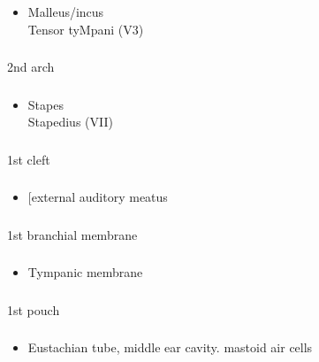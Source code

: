 \documentclass[11pt]{beamer}
\begin{document}
\begin{frame}
 \frametitle{}
\begin{itemize}
\item{Malleus/incus \\ Tensor tyMpani (V3)}
\end{itemize}
\end{frame}

\begin{frame}
 \frametitle{}
2nd arch
\end{frame}

\begin{frame}
 \frametitle{}
\begin{itemize}
\item{Stapes \\ Stapedius (VII)}
\end{itemize}
\end{frame}

\begin{frame}
 \frametitle{}
1st cleft
\end{frame}

\begin{frame}
 \frametitle{}
\begin{itemize}
\item{[external auditory meatus}
\end{itemize}
\end{frame}

\begin{frame}
 \frametitle{}
1st branchial membrane
\end{frame}

\begin{frame}
 \frametitle{}
\begin{itemize}
\item{Tympanic membrane}
\end{itemize}
\end{frame}

\begin{frame}
 \frametitle{}
1st pouch
\end{frame}

\begin{frame}
 \frametitle{}
\begin{itemize}
\item{Eustachian tube, middle ear cavity. mastoid air cells}
\end{itemize}
\end{frame}
\end{document}
